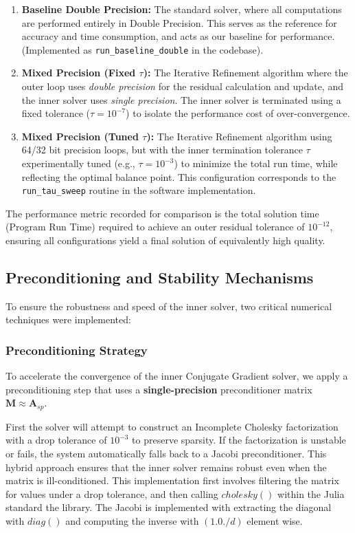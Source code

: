 \documentclass[a4paper,10.5pt,twoside]{article}
\begin{document}
\begin{enumerate}
    \item \textbf{Baseline Double Precision:} The standard solver, where all computations are performed entirely in Double Precision. This serves as the reference for accuracy and time consumption, and acts as our baseline for performance. (Implemented as \texttt{run\_baseline\_double} in the codebase).
    \item \textbf{Mixed Precision (Fixed $\tau$):} The Iterative Refinement algorithm where the outer loop uses \textit{double precision} for the residual calculation and update, and the inner solver uses \textit{single precision}. The inner solver is terminated using a fixed tolerance ($\tau=10^{-7}$) to isolate the performance cost of over-convergence.
    \item \textbf{Mixed Precision (Tuned $\tau$):} The Iterative Refinement algorithm using 64/32 bit precision loops, but with the inner termination tolerance $\tau$ experimentally tuned (e.g., $\tau=10^{-3}$) to minimize the total run time, while reflecting the optimal balance point. This configuration corresponds to the \texttt{run\_tau\_sweep} routine in the software implementation.
\end{enumerate}

The performance metric recorded for comparison is the total solution time (Program Run Time) required to achieve an outer residual tolerance of $10^{-12}$, ensuring all configurations yield a final solution of equivalently high quality.

\subsection{Preconditioning and Stability Mechanisms}

To ensure the robustness and speed of the inner solver, two critical numerical techniques were implemented:

\subsubsection{Preconditioning Strategy}
To accelerate the convergence of the inner Conjugate Gradient solver, we apply a preconditioning step that  uses a \textbf{single-precision} preconditioner matrix $\mathbf{M} \approx \mathbf{A}_{sp}$.

First the solver will attempt to construct an Incomplete Cholesky factorization with a drop tolerance of $10^{-3}$ to preserve sparsity. If the factorization is unstable or fails, the system automatically falls back to a Jacobi preconditioner. This hybrid approach ensures that the inner solver remains robust even when the matrix is ill-conditioned. This implementation first involves filtering the matrix for values under a drop tolerance, and then calling $cholesky()$ within the Julia standard the library. The Jacobi is implemented with extracting the diagonal with $diag()$ and computing the inverse with $(1.0 ./ d)$ element wise.
\end{document}
